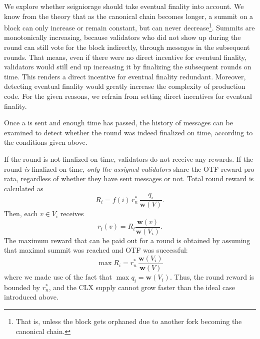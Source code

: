 We explore whether seigniorage should take eventual finality into account. We know from the theory that as the canonical chain becomes longer, a summit on a block can only increase or remain constant, but can never decrease\footnote{That is, unless the block gets orphaned due to another fork becoming the canonical chain.}. Summits are monotonically increasing, because validators who did not show up during the round can still vote for the block indirectly, through messages in the subsequent rounds. That means, even if there were no direct incentive for eventual finality, validators would still end up increasing it by finalizing the subsequent rounds on time. This renders a direct incentive for eventual finality redundant. Moreover, detecting eventual finality would greatly increase the complexity of production code. For the given reasons, we refrain from setting direct incentives for eventual finality.

Once a \PROP is sent and enough time has passed, the history of messages can be examined to detect whether the round was indeed finalized on time, according to the conditions given above.

If the round is not finalized on time, validators do not receive any rewards. If the round \emph{is} finalized on time, \emph{only the assigned validators} share the OTF reward pro rata, regardless of whether they have sent messages or not. Total round reward is calculated as
%
\begin{equation}
  R_i = f(i) \, r^\ast_n \,
  \frac{q_{i}}{\boldsymbol{w}(V)}
  .
\end{equation}
%
Then, each $v\in V_i$ receives
%
\begin{equation}
  r_i(v) = R_i \frac{\boldsymbol{w}(v)}{\boldsymbol{w}(V_i)}
  .
\end{equation}
%
The maximum reward that can be paid out for a round is obtained by assuming that maximal summit was reached and OTF was successful:
%
\begin{equation}
  \max R_i = r^\ast_n \,
  \frac{\boldsymbol{w}(V_i)}{\boldsymbol{w}(V)}
\end{equation}
%
where we made use of the fact that $\max q_{i} = \boldsymbol{w}(V_i)$. Thus, the round reward is bounded by $r^\ast_n$, and the CLX supply cannot grow faster than the ideal case introduced above.

